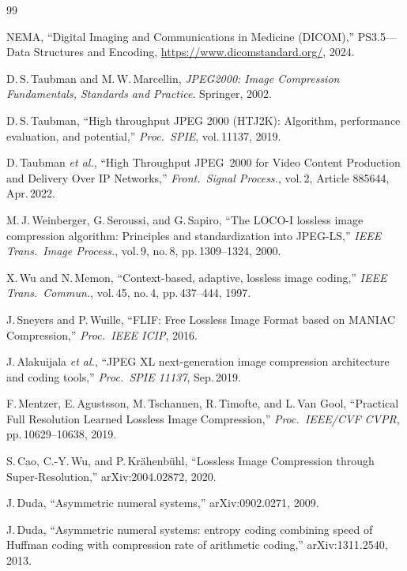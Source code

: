 \documentclass[journal]{IEEEtran}
\begin{document}
\begin{thebibliography}{99}

NEMA, ``Digital Imaging and Communications in Medicine (DICOM),''
PS3.5---Data Structures and Encoding,
\url{https://www.dicomstandard.org/}, 2024.

D.\,S.\,Taubman and M.\,W.\,Marcellin,
\textit{JPEG2000: Image Compression Fundamentals, Standards and Practice}.
Springer, 2002.

D.\,S.\,Taubman, ``High throughput JPEG 2000 (HTJ2K): Algorithm, performance
evaluation, and potential,'' \textit{Proc.\ SPIE}, vol.\,11137, 2019.

D.\,Taubman \textit{et al.},
``High Throughput JPEG~2000 for Video Content Production and Delivery Over IP
Networks,''
\textit{Front.\ Signal Process.}, vol.\,2, Article 885644, Apr.\,2022.

M.\,J.\,Weinberger, G.\,Seroussi, and G.\,Sapiro,
``The LOCO-I lossless image compression algorithm: Principles and
standardization into JPEG-LS,''
\textit{IEEE Trans.\ Image Process.}, vol.\,9, no.\,8, pp.\,1309--1324, 2000.

X.\,Wu and N.\,Memon,
``Context-based, adaptive, lossless image coding,''
\textit{IEEE Trans.\ Commun.}, vol.\,45, no.\,4, pp.\,437--444, 1997.

J.\,Sneyers and P.\,Wuille,
``FLIF: Free Lossless Image Format based on MANIAC Compression,''
\textit{Proc.\ IEEE ICIP}, 2016.

J.\,Alakuijala \textit{et al.},
``JPEG XL next-generation image compression architecture and coding tools,''
\textit{Proc.\ SPIE 11137}, Sep.\,2019.

F.\,Mentzer, E.\,Agustsson, M.\,Tschannen, R.\,Timofte, and L.\,Van Gool,
``Practical Full Resolution Learned Lossless Image Compression,''
\textit{Proc.\ IEEE/CVF CVPR}, pp.\,10629--10638, 2019.

S.\,Cao, C.-Y.\,Wu, and P.\,Kr\"ahenb\"uhl,
``Lossless Image Compression through Super-Resolution,''
arXiv:2004.02872, 2020.

J.\,Duda, ``Asymmetric numeral systems,'' arXiv:0902.0271, 2009.

J.\,Duda, ``Asymmetric numeral systems: entropy coding combining speed of
Huffman coding with compression rate of arithmetic coding,''
arXiv:1311.2540, 2013.


\end{thebibliography}
\end{document}
